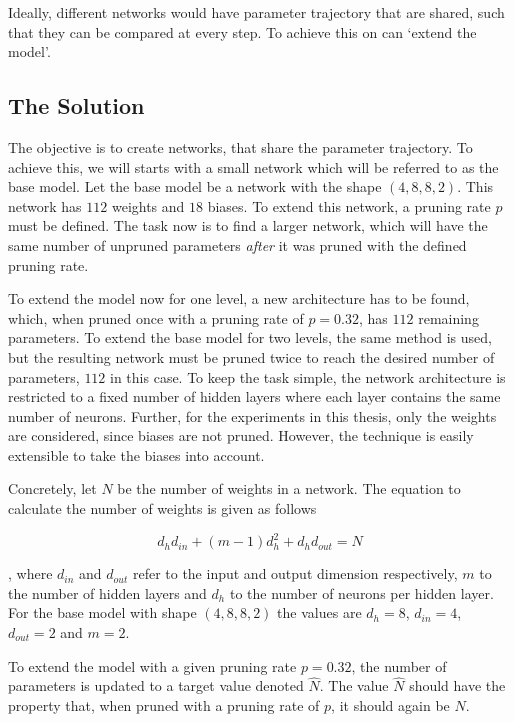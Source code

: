 Ideally, different networks would have parameter trajectory that are shared, such that they can be compared at every step.
To achieve this on can `extend the model'.

\subsection{The Solution}
The objective is to create networks, that share the parameter trajectory.
To achieve this, we will starts with a small network which will be referred to as the base model.
Let the base model be a network with the shape $(4, 8, 8, 2)$.
This network has $112$ weights and $18$ biases.
To extend this network, a pruning rate $p$ must be defined.
The task now is to find a larger network, which will have the same number of unpruned parameters \textit{after} it was pruned with the defined pruning rate.

To extend the model now for one level, a new architecture has to be found, which, when pruned once with a pruning rate of $p=0.32$, has $112$ remaining parameters.
To extend the base model for two levels, the same method is used, but the resulting network must be pruned twice to reach the desired number of parameters, $112$ in this case.
To keep the task simple, the network architecture is restricted to a fixed number of hidden layers where each layer contains the same number of neurons.
Further, for the experiments in this thesis, only the weights are considered, since biases are not pruned.
However, the technique is easily extensible to take the biases into account.

Concretely, let $N$ be the number of weights in a network.
The equation to calculate the number of weights is given as follows

\begin{equation} \label{eq:num_params}
    d_h d_{in}+(m-1)d_h^2 + d_h d_{out} = N
\end{equation}

, where $d_{in}$ and $d_{out}$ refer to the input and output dimension respectively, $m$ to the number of hidden layers and
$d_h$ to the number of neurons per hidden layer.
For the base model with shape $(4, 8, 8, 2)$ the values are $d_h=8$, 
$d_{in}=4$, $d_{out}=2$ and $m=2$.
 
To extend the model with a given pruning rate $p=0.32$, the number of parameters is updated to a target value denoted $\hat N$.
The value $\hat N$ should have the property that, when pruned with a pruning rate of $p$, it should again be $N$.

